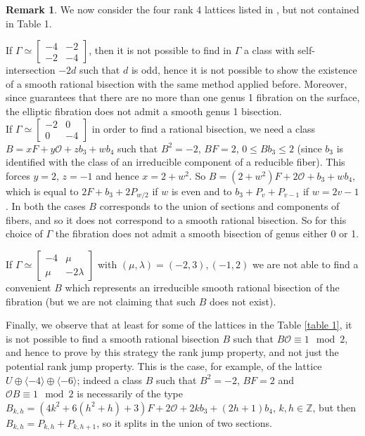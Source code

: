 \documentclass{amsart}
\theoremstyle{definition}
\newtheorem{remark}[theorem]{Remark}
\numberwithin{equation}{section}
\renewcommand{\O}{\mathcal{O}}
\begin{document}
\begin{remark}
We now consider the four rank 4 lattices listed in \cite{GM}, but not contained in Table 1.

If $\Gamma\simeq \left[\begin{array}{rr}-4&-2\\-2&-4\end{array}\right]$, then it is not possible to find in $\Gamma$ a class with self-intersection $-2d$ such that $d$ is odd, hence it is not possible to show the existence of a smooth rational bisection with the same method applied before. Moreover, since \cite{GM} guarantees that there are no more than one genus 1 fibration on the surface, the elliptic fibration does not admit a smooth genus 1 bisection. \\

If $\Gamma\simeq\left[\begin{array}{rr}-2&0\\0&-4\end{array}\right]$ in order to find a rational bisection, we need a class $B=xF+y\O+z b_3+wb_4$ such that $B^2=-2$, $BF=2$, $0\leq Bb_3\leq 2$ (since $b_3$ is identified with the class of an irreducible component of a reducible fiber). This forces $y=2$, $z=-1$ and hence $x=2+w^2$. So $B=(2+w^2)F+2\O+b_3+wb_4$, which is equal to $2F+b_3+2P_{w/2}$ if $w$ is even and to $b_3+P_{v}+P_{v-1}$ if $w=2v-1$. In both the cases $B$ corresponds to the union of sections and components of fibers, and so it does not correspond to a smooth rational bisection. So for this choice of $\Gamma$ the fibration does not admit a smooth bisection of genus either 0 or 1.

If $\Gamma\simeq\left[\begin{array}{rr}-4&\mu\\\mu&-2\lambda\end{array}\right]$ with $(\mu,\lambda)=(-2,3),(-1,2)$ we are not able to find a convenient $B$ which represents an irreducible smooth rational bisection of the fibration (but we are not claiming that such $B$ does not exist). 

Finally, we observe that at least for some of the lattices in the Table \ref{table 1}, it is not possible to find a smooth rational bisection $B$ such that $B\mathcal{O}\equiv 1\mod 2$, and hence to prove by this strategy the rank jump property, and not just the potential rank jump property. This is the case, for example, of the lattice $U\oplus \langle -4\rangle\oplus \langle -6\rangle$; indeed a class $B$ such that $B^2=-2$, $BF=2$ and $\O B\mathcal\equiv 1 \mod 2$ is necessarily of the type $B_{k,h}=(4k^2+6(h^2+h)+3)F+2\mathcal{O}+2kb_3+(2h+1)b_4$, $k,h\in\mathbb{Z}$, but then $B_{k,h}=P_{k,h}+P_{k,h+1}$, so it splits in the union of two sections.
\end{remark}
\end{document}
